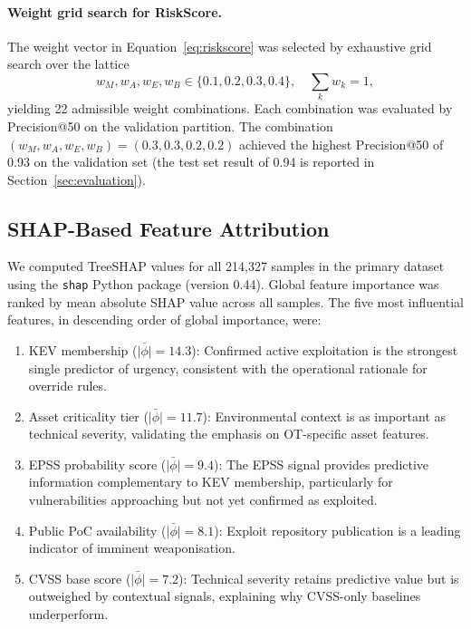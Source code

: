 \documentclass[review,12pt]{elsarticle}
\begin{document}
\paragraph{Weight grid search for RiskScore.} The weight vector in Equation~\ref{eq:riskscore} was selected by exhaustive grid search over the lattice
\[
  w_M, w_A, w_E, w_B \in \{0.1, 0.2, 0.3, 0.4\}, \quad \sum_k w_k = 1,
\]
yielding 22 admissible weight combinations. Each combination was evaluated by Precision@50 on the validation partition. The combination $(w_M, w_A, w_E, w_B) = (0.3, 0.3, 0.2, 0.2)$ achieved the highest Precision@50 of 0.93 on the validation set (the test set result of 0.94 is reported in Section~\ref{sec:evaluation}).

\subsection{SHAP-Based Feature Attribution}
\label{sec:methodology:shap}

We computed TreeSHAP values for all 214,327 samples in the primary dataset using the \texttt{shap} Python package (version 0.44). Global feature importance was ranked by mean absolute SHAP value across all samples. The five most influential features, in descending order of global importance, were:

\begin{enumerate}[label=(\arabic*)]
  \item KEV membership ($\bar{|\phi|} = 14.3$): Confirmed active exploitation is the strongest single predictor of urgency, consistent with the operational rationale for override rules.
  \item Asset criticality tier ($\bar{|\phi|} = 11.7$): Environmental context is as important as technical severity, validating the emphasis on OT-specific asset features.
  \item EPSS probability score ($\bar{|\phi|} = 9.4$): The EPSS signal provides predictive information complementary to KEV membership, particularly for vulnerabilities approaching but not yet confirmed as exploited.
  \item Public PoC availability ($\bar{|\phi|} = 8.1$): Exploit repository publication is a leading indicator of imminent weaponisation.
  \item CVSS base score ($\bar{|\phi|} = 7.2$): Technical severity retains predictive value but is outweighed by contextual signals, explaining why CVSS-only baselines underperform.
\end{enumerate}
\end{document}
